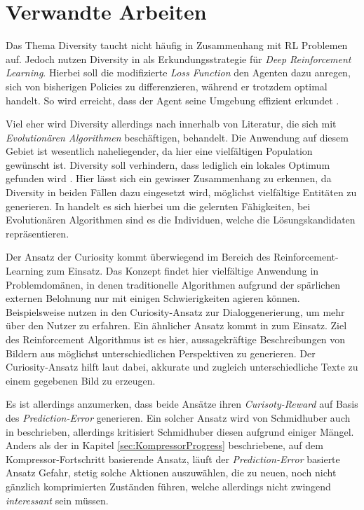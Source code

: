 
\section{Verwandte Arbeiten}
\label{sec:related}

Das Thema Diversity taucht nicht häufig in Zusammenhang mit RL Problemen auf. Jedoch nutzen \citeauthor{hong2018diversity} Diversity in \cite{hong2018diversity} als Erkundungsstrategie für \textit{Deep Reinforcement Learning}. Hierbei soll die modifizierte \textit{Loss Function} den Agenten dazu anregen, sich von bisherigen Policies zu differenzieren, während er trotzdem optimal handelt. So wird erreicht, dass der Agent seine Umgebung effizient erkundet \cite{hong2018diversity}.

Viel eher wird Diversity allerdings nach \cite{gabor2018inheritance} innerhalb von Literatur, die sich mit \textit{Evolutionären Algorithmen} beschäftigen, behandelt. Die Anwendung auf diesem Gebiet ist wesentlich naheliegender, da hier eine vielfältigen Population gewünscht ist. Diversity soll verhindern, dass lediglich ein lokales Optimum gefunden wird \cite{gabor2018inheritance}. Hier lässt sich ein gewisser Zusammenhang zu \cite{diversity_eysenbach} erkennen, da Diversity in beiden Fällen dazu eingesetzt wird, möglichst vielfältige Entitäten zu generieren. In \cite{diversity_eysenbach} handelt es sich hierbei um die gelernten Fähigkeiten, bei Evolutionären Algorithmen sind es die Individuen, welche die Lösungskandidaten repräsentieren.

\smallspace

Der Ansatz der Curiosity kommt überwiegend im Bereich des Reinforcement-Learning zum Einsatz. Das Konzept findet hier vielfältige Anwendung in Problemdomänen, in denen traditionelle Algorithmen aufgrund der spärlichen externen Belohnung nur mit einigen Schwierigkeiten agieren können. Beispielsweise nutzen \citeauthor{8683033} in \cite{8683033} den Curiosity-Ansatz zur Dialoggenerierung, um mehr über den Nutzer zu erfahren. Ein ähnlicher Ansatz kommt in \cite{luo2019curiositydriven} zum Einsatz. Ziel des Reinforcement Algorithmus ist es hier, aussagekräftige Beschreibungen von Bildern aus möglichst unterschiedlichen Perspektiven zu generieren. Der Curiosity-Ansatz hilft laut \citeauthor{luo2019curiositydriven} dabei, akkurate und zugleich unterschiedliche Texte zu einem gegebenen Bild zu erzeugen. 

Es ist allerdings anzumerken, dass beide Ansätze ihren \emph{Curisoty-Reward} auf Basis des \emph{Prediction-Error} generieren. Ein solcher Ansatz wird von Schmidhuber auch in \cite{curiosity_schmidhuber} beschrieben, allerdings kritisiert Schmidhuber diesen aufgrund einiger Mängel. Anders als der in Kapitel \ref{sec:KompressorProgress} beschriebene, auf dem Kompressor-Fortschritt basierende Ansatz, läuft der \emph{Prediction-Error} basierte Ansatz Gefahr, stetig solche Aktionen auszuwählen, die zu neuen, noch nicht gänzlich komprimierten Zuständen führen, welche allerdings nicht zwingend \emph{interessant} sein müssen. \cite{curiosity_schmidhuber}